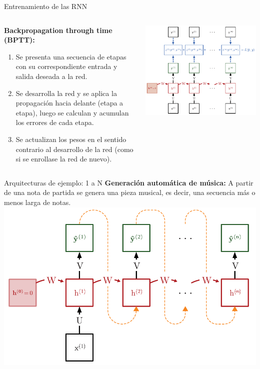 \documentclass[aspectratio=169]{beamer}
\begin{document}
\begin{frame}{Entrenamiento de las RNN}
	\begin{columns}
		\begin{column}{0.5\textwidth}
			\textbf{Backpropagation through time (BPTT):} 
			\begin{enumerate}
				\item Se presenta una secuencia de etapas con su correspondiente entrada y salida deseada a la red.
				\item Se desarrolla la red y se aplica la propagación hacia delante (etapa a etapa), luego se calculan y acumulan los errores de cada etapa.
				\item Se actualizan los pesos en el sentido contrario al desarrollo de la red (como si se enrollase la red de nuevo).
			\end{enumerate}

		\end{column}

		\begin{column}{0.5\textwidth}
			\includegraphics[width=.9\textwidth]{imgs/tema4/rnn/TRAIN1.pdf}
		\end{column}
	\end{columns}

\end{frame}


\begin{frame}[t]{Arquitecturas de ejemplo: 1 a N}
	\textbf{Generación automática de música:} A partir de una nota de partida se genera una pieza musical, es decir, una secuencia más o menos larga de notas.\\
	\vspace{.3cm}
	\includegraphics[width=.55\textwidth, center]{imgs/tema4/rnn/M1N.pdf}
\end{frame}
\end{document}
